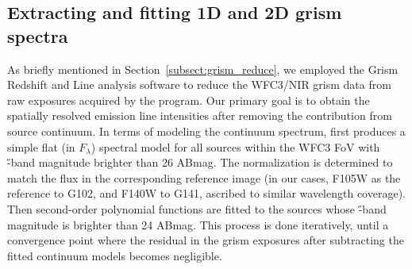 \renewcommand{\thesubsection}{\thechapter.A.\arabic{subsection}}
\subsection{Extracting and fitting 1D and 2D \protect\hst grism spectra}\label{sect:grismspec}

As briefly mentioned in Section~\ref{subsect:grism_reduce}, we employed the Grism Redshift and Line analysis 
software \grzl to reduce the \hst WFC3/NIR grism data from raw exposures acquired by the \glass program.
Our primary goal is to obtain the spatially resolved emission line intensities after removing the contribution 
from source continuum.
In terms of modeling the continuum spectrum, \grzl first produces a simple flat (in $F_{\lambda}$)
spectral model for all sources within the WFC3 FoV with \H-band magnitude brighter than 26 ABmag.
The normalization is determined to match the flux in the corresponding reference image (in our cases, F105W as 
the reference to G102, and F140W to G141, ascribed to similar wavelength coverage).
Then second-order polynomial functions are fitted to the sources whose \H-band magnitude is brighter than 24 
ABmag.
This process is done iteratively, until a convergence point where the residual in the grism exposures after
subtracting the fitted continuum models becomes negligible.

